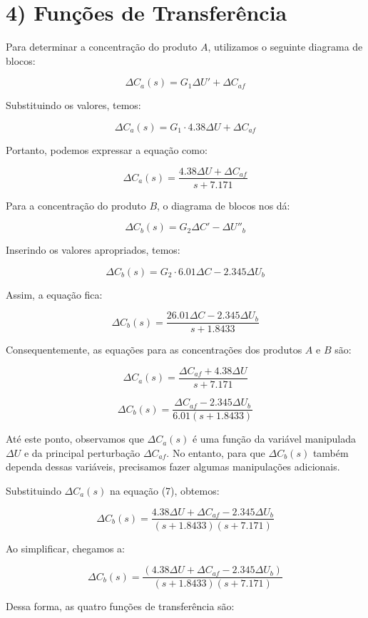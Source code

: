 \documentclass[a4paper,12pt]{report}
\begin{document}
\newpage

\section{4) Funções de Transferência}

Para determinar a concentração do produto \(A\), utilizamos o seguinte diagrama de blocos:

\[
\Delta C_a(s) = G_1 \Delta U' + \Delta C_{af}
\]

Substituindo os valores, temos:

\[
\Delta C_a(s) = G_1 \cdot 4.38 \Delta U + \Delta C_{af}
\]

Portanto, podemos expressar a equação como:

\[
\Delta C_a(s) = \frac{4.38 \Delta U + \Delta C_{af}}{s + 7.171}
\]

Para a concentração do produto \(B\), o diagrama de blocos nos dá:

\[
\Delta C_b(s) = G_2 \Delta C' - \Delta U''_b
\]

Inserindo os valores apropriados, temos:

\[
\Delta C_b(s) = G_2 \cdot 6.01 \Delta C - 2.345 \Delta U_b
\]

Assim, a equação fica:

\[
\Delta C_b(s) = \frac{26.01 \Delta C - 2.345 \Delta U_b}{s + 1.8433}
\]

Consequentemente, as equações para as concentrações dos produtos \(A\) e \(B\) são:

\[
\Delta C_a(s) = \frac{\Delta C_{af} + 4.38 \Delta U}{s + 7.171}
\]

\[
\Delta C_b(s) = \frac{\Delta C_{af} - 2.345 \Delta U_b}{6.01 (s + 1.8433)}
\]

Até este ponto, observamos que \(\Delta C_a(s)\) é uma função da variável manipulada \(\Delta U\) e da principal perturbação \(\Delta C_{af}\). No entanto, para que \(\Delta C_b(s)\) também dependa dessas variáveis, precisamos fazer algumas manipulações adicionais.

Substituindo \(\Delta C_a(s)\) na equação (7), obtemos:

\[
\Delta C_b(s) = \frac{4.38 \Delta U + \Delta C_{af} - 2.345 \Delta U_b}{(s + 1.8433)(s + 7.171)}
\]

Ao simplificar, chegamos a:

\[
\Delta C_b(s) = \frac{(4.38 \Delta U + \Delta C_{af} - 2.345 \Delta U_b)}{(s + 1.8433)(s + 7.171)}
\]

Dessa forma, as quatro funções de transferência são:
\end{document}
